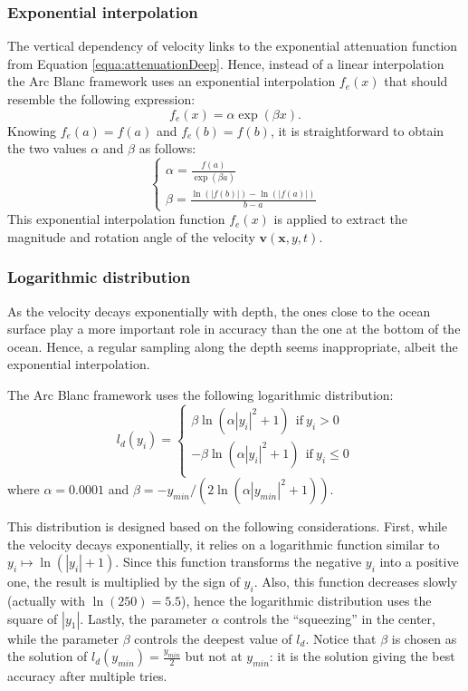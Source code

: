 \documentclass[final]{jcgt}
\def\Framework{The Arc Blanc framework\xspace}
\def\framework{the Arc Blanc framework\xspace}
\begin{document}
\subsubsection{Exponential interpolation}
The vertical dependency of velocity links to the exponential attenuation function from Equation \ref{equa:attenuationDeep}.
Hence, instead of a linear interpolation \framework uses an exponential interpolation $f_e(x)$ that should resemble the following expression:
\begin{equation}
	f_e(x)=\alpha \exp(\beta x).
\end{equation}
Knowing $f_e(a)=f(a)$ and $f_e(b)=f(b)$, it is straightforward to obtain the two values $\alpha$ and $\beta$ as follows:
\begin{equation}
	\begin{cases}
		\displaystyle\alpha = \frac{f(a)}{\exp(\beta a)} \\
		\displaystyle\beta = \frac{\ln(|f(b)|) - \ln(|f(a)|)}{b - a}
	\end{cases}
\end{equation}
This exponential interpolation function $f_e(x)$ is applied to extract the magnitude and rotation angle of the velocity $\mathbf v(\mathbf x,y,t)$.

\subsubsection{Logarithmic distribution}
As the velocity decays exponentially with depth, the ones close to the ocean surface play a more important role in accuracy than the one at the bottom of the ocean.
Hence, a regular sampling along the depth seems inappropriate, albeit the exponential interpolation.

\Framework uses the following logarithmic distribution:
\begin{equation}
	l_d(y_i) =
	\begin{cases}
		\beta \ln(\alpha|y_i|^2+1) ~~\text{if}~y_i>0     \\
		-\beta \ln(\alpha|y_i|^2+1) ~~\text{if}~y_i\leq0 \\
	\end{cases}
\end{equation}
where $\alpha=0.0001$ and $\beta = -y_{min}/\left(2 \ln(\alpha |y_{min}|^2 + 1)\right)$.

This distribution is designed based on the following considerations.
First, while the velocity decays exponentially, it relies on a logarithmic function similar to $y_i\mapsto \ln(|y_i|+1)$.
Since this function transforms the negative $y_i$ into a positive one, the result is multiplied by the sign of $y_i$.
Also, this function decreases slowly (actually with $\ln(250)=5.5$), hence the logarithmic distribution uses the square of $|y_1|$.
Lastly, the parameter $\alpha$ controls the “squeezing” in the center, while the parameter $\beta$ controls the deepest value of $l_d$.
Notice that $\beta$ is chosen as the solution of $l_d(y_{min})=\frac{y_{min}}{2}$ but not at $y_{min}$: it is the solution giving the best accuracy after multiple tries.
\end{document}
